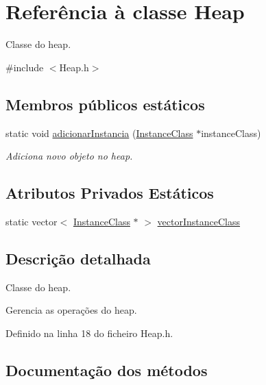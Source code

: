 \hypertarget{classHeap}{}\section{Referência à classe Heap}
\label{classHeap}


Classe do heap.  




{\ttfamily \#include $<$Heap.\+h$>$}

\subsection*{Membros públicos estáticos}
\begin{DoxyCompactItemize}
\item 
static void \hyperlink{classHeap_a5361fe54c9cca238575e2fe2b8462366}{adicionar\+Instancia} (\hyperlink{classInstanceClass}{Instance\+Class} $\ast$instance\+Class)
\begin{DoxyCompactList}\small\item\em Adiciona novo objeto no heap. \end{DoxyCompactList}\end{DoxyCompactItemize}
\subsection*{Atributos Privados Estáticos}
\begin{DoxyCompactItemize}
\item 
static vector$<$ \hyperlink{classInstanceClass}{Instance\+Class} $\ast$ $>$ \hyperlink{classHeap_a228364dcf1e708ceadc9e1f38928169c}{vector\+Instance\+Class}
\end{DoxyCompactItemize}


\subsection{Descrição detalhada}
Classe do heap. 

Gerencia as operações do heap. 

Definido na linha 18 do ficheiro Heap.\+h.



\subsection{Documentação dos métodos}
\mbox{\label{classHeap_a5361fe54c9cca238575e2fe2b8462366}} 

